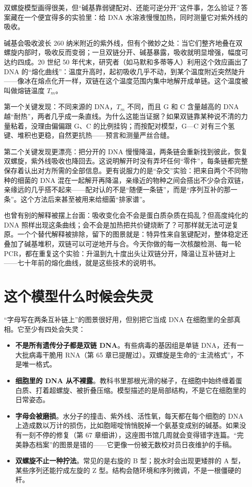 \begin{zhengju}
双螺旋模型画得很美，但“碱基靠弱键配对、还能可逆分开”这件事，怎么验证？答案藏在一个便宜得多的实验里：给 DNA 水溶液慢慢加热，同时测量它对紫外线的吸收。

碱基会吸收波长 260 纳米附近的紫外线，但有个微妙之处：当它们整齐地叠在双螺旋内部时，吸收反而变弱；一旦双链分开、碱基暴露，吸收就明显增强，幅度可达约四成。20 世纪 50 年代末，研究者（如马默和多蒂等人）利用这个效应画出了 DNA 的“熔化曲线”：温度升高时，起初吸收几乎不动，到某个温度附近突然陡升——像冰在熔点化开一样，双链在这个温度范围内集中地解开成单链。这个温度被叫做熔链温度 $T_m$。

第一个关键发现：不同来源的 DNA，$T_m$ 不同，而且 G 和 C 含量越高的 DNA 越“耐热”，两者几乎成一条直线。为什么这能当证据？如果双链靠某种说不清的力量粘着，没理由偏偏跟 G、C 的比例挂钩；而按配对模型，G—C 对有三个氢键、堆积也更稳，自然更抗热——预言和测量严丝合缝。

第二个关键发现更漂亮：把分开的 DNA 慢慢降温，两条链会重新找到彼此，恢复双螺旋，紫外线吸收也降回去。这说明解开时没有弄坏任何“零件”，每条链都完整保存着认出对方所需的全部信息。更有说服力的是“杂交”实验：把来自两个不同物种的细菌的 DNA 混在一起解开再降温，亲缘近的物种之间会搭出不少杂合双链，亲缘远的几乎搭不起来——配对认的不是“随便一条链”，而是“序列互补的那一条”。这个方法后来甚至被用来给细菌“排家谱”。

也曾有别的解释被摆上台面：吸收变化会不会是蛋白质杂质在捣乱？但高度纯化的 DNA 照样出现这条曲线；会不会是加热把共价键烧断了？可那样就无法可逆复原。一个个替代解释被排除，留下的图景就是：特异性来自氢键配对，整体稳定还叠加了碱基堆积，双链可以可逆地开与合。今天你做的每一次核酸检测、每一轮 PCR，都在重复这个实验：升温到九十度出头让双链分开，降温让互补链对上——七十年前的熔化曲线，就是这些技术的说明书。
\end{zhengju}

\section{这个模型什么时候会失灵}

“字母写在两条互补链上”的图景很好用，但别把它当成 DNA 在细胞里的全部真相。它至少有四处会失灵：

\begin{itemize}[itemsep=2pt]
\item \textbf{不是所有遗传分子都是双链 DNA}。有些病毒的基因组是单链 DNA，还有一大批病毒干脆用 RNA（第 65 章已提醒过）。双螺旋是生命的“主流格式”，不是唯一格式。
\item \textbf{细胞里的 DNA 从不裸露}。教科书里那根光滑的梯子，在细胞中始终缠着蛋白质、打着超螺旋、被折叠压缩。模型描述的是局部结构，不是它在细胞里的日常姿态。
\item \textbf{字母会被磨损}。水分子的撞击、紫外线、活性氧，每天都在每个细胞的 DNA 上造成数以万计的损伤，比如胞嘧啶悄悄脱掉一个氨基变成别的碱基。如果没有一刻不停的修复（第 67 章细讲），这座图书馆几周就会变得错字连篇。“完美静态档案”的图景是错的——它更像一份被无数校对员日夜维护的手稿。
\item \textbf{双螺旋不止一种拧法}。常见的是右旋的 B 型；脱水时会出现更矮胖的 A 型，某些序列还能拧成左旋的 Z 型。结构会随环境和序列微调，不是一根僵硬的杆。
\end{itemize}

